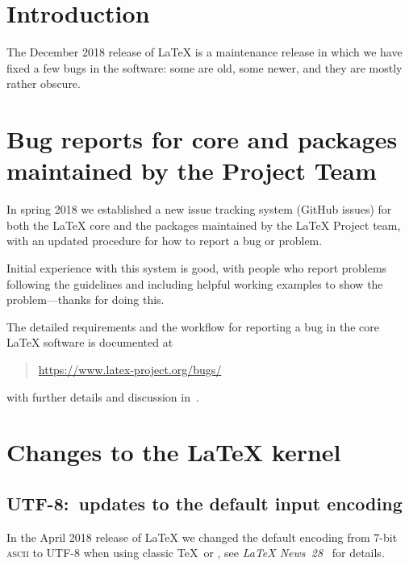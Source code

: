 \documentclass{ltnews}
\providecommand\acro[1]{\textsc{#1}}
\begin{document}
\maketitle
\tableofcontents

\setlength{}

\bigskip

\section{Introduction}

The December 2018 release of \LaTeX{} is a maintenance release in
which we have fixed a few bugs in the software: some are old, some
newer, and they are mostly rather obscure.

\section[Bug reports for core \LaTeXe{} and packages]
        {Bug reports for core \LaTeXe{} and packages maintained by the Project Team}

In spring 2018 we established a new issue tracking system (GitHub
issues) for both the \LaTeX{} core and the packages maintained by the
\LaTeX{} Project team, with an updated procedure for how to report a
bug or problem.

Initial experience with this system is good, with people who report
problems following the guidelines and including helpful working
examples to show the problem---thanks for doing this.

The detailed requirements and the workflow for reporting a bug in the
core \LaTeX{} software is documented at
\begin{quote}
\url{https://www.latex-project.org/bugs/}
\end{quote}
with further details and discussion in~\cite{Mittelbach:TB39-1}.


\section{Changes to the \LaTeX{} kernel}

\subsection{UTF-8:\ updates to the default input encoding}

In the April 2018 release of \LaTeX{} we changed the default encoding
from 7-bit \acro{ascii} to UTF-8 when using classic \TeX\ or
, see \textit{\LaTeX{} News~28}~\cite{ltnews28} for
details.
\end{document}
